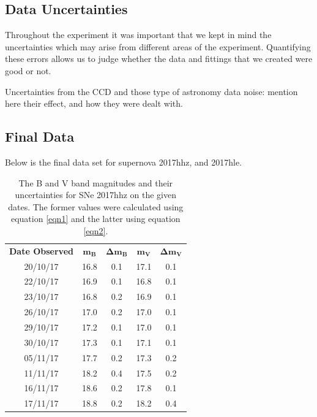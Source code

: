 \documentclass[twocolumn]{revtex4}
\begin{document}
\vspace{-3ex}
\subsection{Data Uncertainties}
\vspace{-2ex}

Throughout the experiment it was important that we kept in mind the uncertainties which may arise from different areas of the experiment. Quantifying these errors allows us to judge whether the data and fittings that we created were good or not. 

Uncertainties from the CCD and those type of astronomy data noise: mention here their effect, and how they were dealt with. 

\vspace{-3ex}
\subsection{Final Data}
\vspace{-2ex}

Below is the final data set for supernova 2017hhz, and 2017hle. 

\begin{table}[h!]
\centering
\begin{tabular}{c@{\hskip 20pt}c@{\hskip 20pt}c@{\hskip 20pt}c@{\hskip 20pt}c} 
 \hline
 \textbf{Date Observed} & \textbf{$\boldsymbol{m_B}$} & \textbf{$\boldsymbol{\Delta{m_B}}$} & \textbf{$\boldsymbol{m_V}$} & \textbf{$\boldsymbol{\Delta{m_V}}$} \\ [0.5ex] 
 20/10/17 & 16.8 & 0.1 & 17.1 & 0.1 \\
 22/10/17 & 16.9 & 0.1 & 16.8 & 0.1 \\
 23/10/17 & 16.8 & 0.2 & 16.9 & 0.1 \\
 26/10/17 & 17.0 & 0.2 & 17.0 & 0.1 \\
 29/10/17 & 17.2 & 0.1 & 17.0 & 0.1 \\
 30/10/17 & 17.3 & 0.1 & 17.1 & 0.1 \\
 05/11/17 & 17.7 & 0.2 & 17.3 & 0.2 \\
 11/11/17 & 18.2 & 0.4 & 17.5 & 0.2 \\
 16/11/17 & 18.6 & 0.2 & 17.8 & 0.1 \\
 17/11/17 & 18.8 & 0.2 & 18.2 & 0.4 \\
 \hline
\end{tabular}
\caption{The B and V band magnitudes and their uncertainties for SNe 2017hhz on the given dates. The former values were calculated using equation \ref{eqn1} and the latter using equation \ref{eqn2}.}
\label{2017hhz-table}
\end{table}
\end{document}
